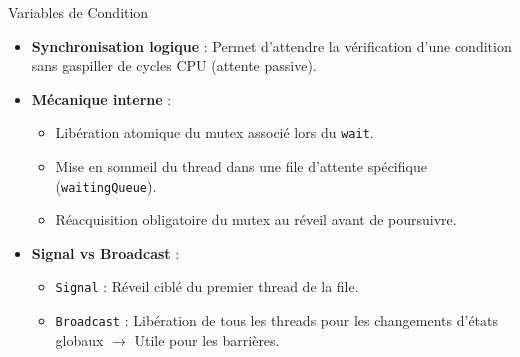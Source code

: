 \begin{frame}{Variables de Condition}
               
\begin{itemize}
    \item \textbf{Synchronisation logique} : Permet d'attendre la vérification d'une condition sans gaspiller de cycles CPU (attente passive).
    \item \textbf{Mécanique interne} :
        \begin{itemize}
            \item Libération atomique du mutex associé lors du \texttt{wait}.
            \item Mise en sommeil du thread dans une file d'attente spécifique (\texttt{waitingQueue}).
            \item Réacquisition obligatoire du mutex au réveil avant de poursuivre.
        \end{itemize}
    \item \textbf{Signal vs Broadcast} :
        \begin{itemize}
            \item \texttt{Signal} : Réveil ciblé du premier thread de la file.
            \item \texttt{Broadcast} : Libération de tous les threads pour les changements d'états globaux $\rightarrow$ Utile pour les barrières.
        \end{itemize}
\end{itemize}
                
\end{frame}
